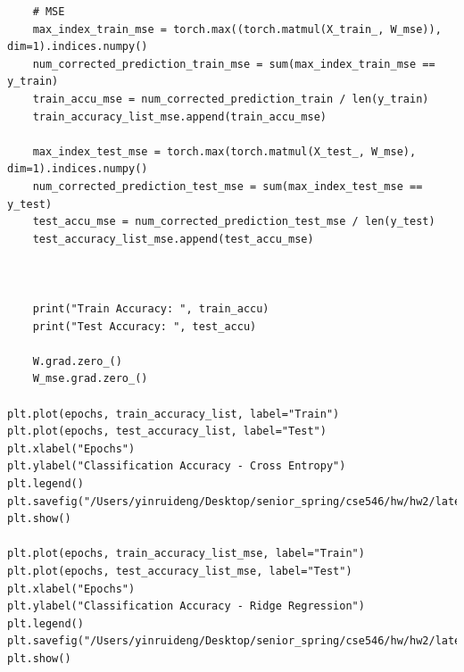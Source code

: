 \documentclass{article}
\begin{document}
\begin{verbatim}
	# MSE
	max_index_train_mse = torch.max((torch.matmul(X_train_, W_mse)), dim=1).indices.numpy()
	num_corrected_prediction_train_mse = sum(max_index_train_mse == y_train)
	train_accu_mse = num_corrected_prediction_train / len(y_train)
	train_accuracy_list_mse.append(train_accu_mse)
	
	max_index_test_mse = torch.max(torch.matmul(X_test_, W_mse), dim=1).indices.numpy()
	num_corrected_prediction_test_mse = sum(max_index_test_mse == y_test)
	test_accu_mse = num_corrected_prediction_test_mse / len(y_test)
	test_accuracy_list_mse.append(test_accu_mse)
	
	
	
	print("Train Accuracy: ", train_accu)
	print("Test Accuracy: ", test_accu)
	
	W.grad.zero_()
	W_mse.grad.zero_()

plt.plot(epochs, train_accuracy_list, label="Train")
plt.plot(epochs, test_accuracy_list, label="Test")
plt.xlabel("Epochs")
plt.ylabel("Classification Accuracy - Cross Entropy")
plt.legend()
plt.savefig("/Users/yinruideng/Desktop/senior_spring/cse546/hw/hw2/latex/B4_c_1.png")
plt.show()

plt.plot(epochs, train_accuracy_list_mse, label="Train")
plt.plot(epochs, test_accuracy_list_mse, label="Test")
plt.xlabel("Epochs")
plt.ylabel("Classification Accuracy - Ridge Regression")
plt.legend()
plt.savefig("/Users/yinruideng/Desktop/senior_spring/cse546/hw/hw2/latex/B4_c_2.png")
plt.show()
\end{verbatim}
\end{document}
